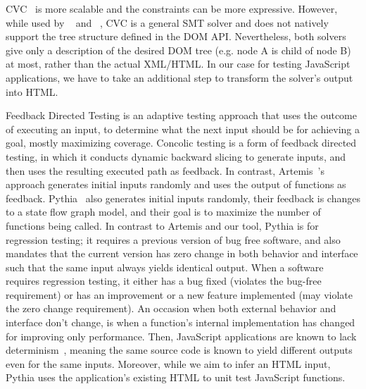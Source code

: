 CVC~\cite{cvc3, cvc4} is more scalable and the constraints can be more expressive.  
However, while used by ~\cite{cute} and ~\cite{jalangi}, CVC is a general SMT solver and does not natively support the tree structure defined in the DOM API.  
Nevertheless, both solvers give only a description of the desired DOM tree (e.g. node A is child of node B) at most, rather than the actual XML/HTML. 
In our case for testing JavaScript applications, we have to take an additional step to transform the solver's output into HTML.


Feedback Directed Testing is an adaptive testing approach that uses the outcome of executing an input, to determine what the next input should be for achieving a goal, mostly maximizing coverage. 
Concolic testing is a form of feedback directed testing, in which it conducts dynamic backward slicing to generate inputs, and then uses the resulting executed path as feedback.  
In contrast, Artemis~\cite{artemis}'s approach generates initial inputs randomly and uses the output of functions as feedback.  
Pythia~\cite{pythia} also generates initial inputs randomly, their feedback is changes to a state flow graph model, and their goal is to maximize the number of functions being called. 
In contrast to Artemis and our tool, Pythia is for regression testing; it requires a previous version of bug free software, and also mandates that the current version has zero change in both behavior and interface such that the same input always yields identical output. 
When a software requires regression testing, it either has a bug fixed (violates the bug-free requirement) or has an improvement or a new feature implemented (may violate the zero change requirement).  
An occasion when both external behavior and interface don't change, is when a function's internal implementation has changed for improving only performance. 
Then, JavaScript applications are known to lack determinism~\cite{mugshot}, meaning the same source code is known to yield different outputs even for the same inputs.  
Moreover, while we aim to infer an HTML input, Pythia uses the application's existing HTML to unit test JavaScript functions.

